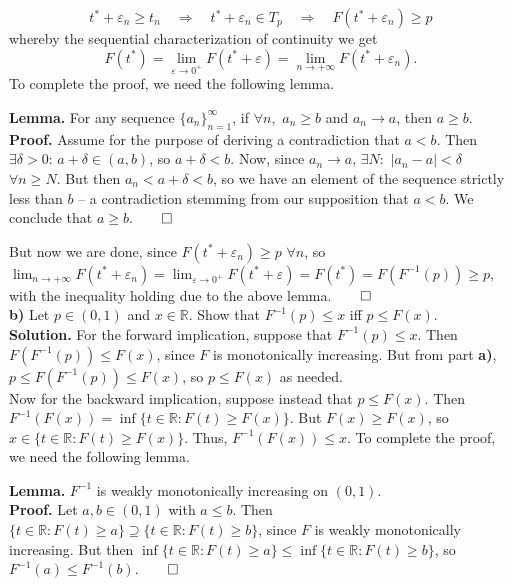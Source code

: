 \documentclass[11pt, letterpaper]{article}
\newcommand{\mbb}[1]{\mathbb{#1}}
\begin{document}
    \[t^\ast+\varepsilon_n\geq t_n\quad\Rightarrow\quad t^\ast+\varepsilon_n\in T_p\quad\Rightarrow\quad F(t^\ast+\varepsilon_n)\geq p\]
    whereby the sequential characterization of continuity we get
    \[F(t^\ast)=\lim_{\varepsilon\longrightarrow 0^+}F(t^\ast+\varepsilon)=\lim_{n\longrightarrow+\infty}F(t^\ast+\varepsilon_n).\]
    To complete the proof, we need the following lemma.\\[3pt]
    \begin{center}
        \begin{minipage}[c]{0.85\linewidth}
            {\bf Lemma.} For any sequence $\{a_n\}_{n=1}^\infty$, if $\forall n,$ $a_n\geq b$ and $a_n\longrightarrow a$, then $a\geq b$.\\[10pt]
            {\bf Proof.} Assume for the purpose of deriving a contradiction that $a<b$. Then $\exists\delta>0$: $a+\delta\in(a,b)$, so $a+\delta<b$. Now, since
            $a_n\longrightarrow a$, $\exists N:$ $|a_n-a|<\delta$ $\forall n\geq N$. But then $a_n<a+\delta<b$, so we have an element of the sequence strictly less than $b$ --
            a contradiction stemming from our supposition that $a<b$. We conclude that $a\geq b$.\hfill{$\qed$}
        \end{minipage}
    \end{center}\vspace{10pt}
    But now we are done, since $F(t^\ast+\varepsilon_n)\geq p$ $\forall n$, so $\lim_{n\rightarrow+\infty}F(t^\ast+\varepsilon_n)=\lim_{\varepsilon\rightarrow 0^+}F(t^\ast+\varepsilon)=F(t^\ast)=F(F^{-1}(p))\geq p$,
    with the inequality holding due to the above lemma.\hfill{$\qed$}\\[10pt]
    {\bf b)} Let $p\in(0,1)$ and $x\in\mbb{R}$. Show that $F^{-1}(p)\leq x$ iff $p\leq F(x)$.\\[10pt]
    {\bf Solution.} For the forward implication, suppose that $F^{-1}(p)\leq x$. Then $F(F^{-1}(p))\leq F(x)$, since $F$ is monotonically increasing.
    But from part {\bf a)}, $p\leq F(F^{-1}(p))\leq F(x)$, so $p\leq F(x)$ as needed.\\[10pt]
    Now for the backward implication, suppose instead that $p\leq F(x)$. Then $F^{-1}(F(x))=\inf\{t\in\mbb{R}:F(t)\geq F(x)\}$. But $F(x)\geq F(x)$, so $x\in\{t\in\mbb{R}:F(t)\geq F(x)\}$. Thus,
    $F^{-1}(F(x))\leq x$. To complete the proof, we need the following lemma.\\[3pt]
    \begin{center}
        \begin{minipage}[c]{0.85\linewidth}
            {\bf Lemma.} $F^{-1}$ is weakly monotonically increasing on $(0,1)$.\\[10pt]
            {\bf Proof.} Let $a,b\in(0,1)$ with $a\leq b$. Then $\{t\in\mbb{R}:F(t)\geq a\}\supseteq\{t\in\mbb{R}:F(t)\geq b\}$, since $F$ is
            weakly monotonically increasing. But then $\inf\{t\in\mbb{R}:F(t)\geq a\}\leq\inf\{t\in\mbb{R}:F(t)\geq b\}$, so $F^{-1}(a)\leq F^{-1}(b)$.\hfill{$\qed$}
        \end{minipage}
    \end{center}\vspace{10pt}
\end{document}

